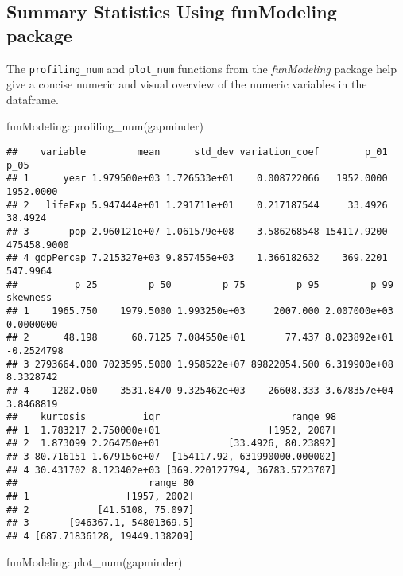\documentclass[
]{book}
\newenvironment{Shaded}{\begin{snugshade}}{\end{snugshade}}
\newcommand{\FunctionTok}[1]{\textcolor[rgb]{0.00,0.00,0.00}{#1}}
\newcommand{\NormalTok}[1]{#1}
\newcommand{\SpecialCharTok}[1]{\textcolor[rgb]{0.00,0.00,0.00}{#1}}
\begin{document}
\hypertarget{summary-statistics-using-funmodeling-package}{%
\subsection{Summary Statistics Using funModeling package}\label{summary-statistics-using-funmodeling-package}}

The \texttt{profiling\_num} and \texttt{plot\_num} functions from the \emph{funModeling} package help
give a concise numeric and visual overview of the numeric variables in the
dataframe.

\begin{Shaded}
\begin{Highlighting}[]
\NormalTok{funModeling}\SpecialCharTok{::}\FunctionTok{profiling\_num}\NormalTok{(gapminder)}
\end{Highlighting}
\end{Shaded}

\begin{verbatim}
##    variable         mean      std_dev variation_coef        p_01        p_05
## 1      year 1.979500e+03 1.726533e+01    0.008722066   1952.0000   1952.0000
## 2   lifeExp 5.947444e+01 1.291711e+01    0.217187544     33.4926     38.4924
## 3       pop 2.960121e+07 1.061579e+08    3.586268548 154117.9200 475458.9000
## 4 gdpPercap 7.215327e+03 9.857455e+03    1.366182632    369.2201    547.9964
##          p_25         p_50         p_75         p_95         p_99   skewness
## 1    1965.750    1979.5000 1.993250e+03     2007.000 2.007000e+03  0.0000000
## 2      48.198      60.7125 7.084550e+01       77.437 8.023892e+01 -0.2524798
## 3 2793664.000 7023595.5000 1.958522e+07 89822054.500 6.319900e+08  8.3328742
## 4    1202.060    3531.8470 9.325462e+03    26608.333 3.678357e+04  3.8468819
##    kurtosis          iqr                       range_98
## 1  1.783217 2.750000e+01                   [1952, 2007]
## 2  1.873099 2.264750e+01            [33.4926, 80.23892]
## 3 80.716151 1.679156e+07  [154117.92, 631990000.000002]
## 4 30.431702 8.123402e+03 [369.220127794, 36783.5723707]
##                       range_80
## 1                 [1957, 2002]
## 2            [41.5108, 75.097]
## 3       [946367.1, 54801369.5]
## 4 [687.71836128, 19449.138209]
\end{verbatim}

\begin{Shaded}
\begin{Highlighting}[]
\NormalTok{funModeling}\SpecialCharTok{::}\FunctionTok{plot\_num}\NormalTok{(gapminder)}
\end{Highlighting}
\end{Shaded}
\end{document}
